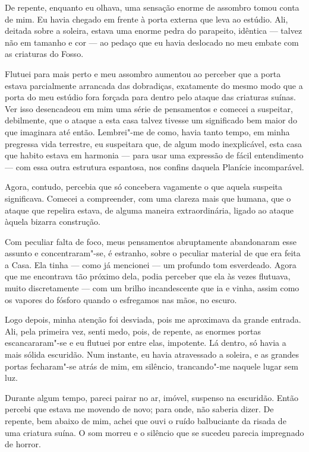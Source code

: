 De repente, enquanto eu olhava, uma sensação enorme de assombro tomou conta de mim. Eu havia chegado em frente à porta
externa que leva ao estúdio. Ali, deitada sobre a soleira, estava uma enorme pedra do parapeito, idêntica --- talvez não
em tamanho e cor --- ao pedaço que eu havia deslocado no meu embate com as criaturas do Fosso.

Flutuei para mais perto e meu assombro aumentou ao perceber que a porta estava parcialmente arrancada das dobradiças,
exatamente do mesmo modo que a porta do meu estúdio fora forçada para dentro pelo ataque das criaturas suínas. Ver isso
desencadeou em mim uma série de pensamentos e comecei a suspeitar, debilmente, que o ataque a esta casa talvez tivesse
um significado bem maior do que imaginara até então. Lembrei"-me de como, havia tanto tempo, em minha pregressa vida
terrestre, eu suspeitara que, de algum modo inexplicável, esta casa que habito estava em harmonia --- para usar uma
expressão de fácil entendimento --- com essa outra estrutura espantosa, nos confins daquela Planície incomparável.

Agora, contudo, percebia que só concebera vagamente o que aquela suspeita significava. Comecei a compreender, com uma
clareza mais que humana, que o ataque que repelira estava, de alguma maneira extraordinária, ligado ao ataque àquela
bizarra construção.

Com peculiar falta de foco, meus pensamentos abruptamente abandonaram esse assunto e concentraram"-se, é estranho,
sobre o peculiar material de que era feita a Casa. Ela tinha --- como já mencionei --- um profundo tom esverdeado.
Agora que me encontrava tão próximo dela, podia perceber que ela às vezes flutuava, muito discretamente --- com um brilho
incandescente que ia e vinha, assim como os vapores do fósforo quando o esfregamos nas mãos, no escuro.

Logo depois, minha atenção foi desviada, pois me aproximava da grande entrada. Ali, pela primeira vez, senti medo,
pois, de repente, as enormes portas escancararam"-se e eu flutuei por entre elas, impotente. Lá dentro, só havia a mais
sólida escuridão. Num instante, eu havia atravessado a soleira, e as grandes portas fecharam"-se atrás de mim,
em silêncio, trancando"-me naquele lugar sem luz. 

Durante algum tempo, pareci pairar no ar, imóvel, suspenso na escuridão. Então percebi que estava me movendo
de novo; para onde, não saberia dizer. De repente, bem abaixo de mim, achei que ouvi o ruído balbuciante da risada de
uma criatura suína. O som morreu e o silêncio que se sucedeu parecia impregnado de horror.

